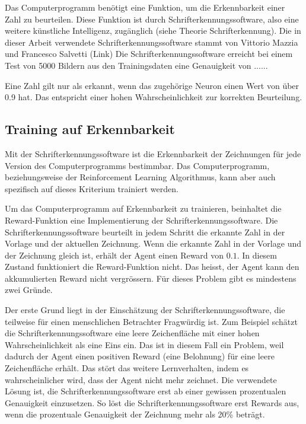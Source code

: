 Das Computerprogramm benötigt eine Funktion, um die Erkennbarkeit einer Zahl zu
beurteilen. Diese Funktion ist durch Schrifterkennungssoftware, also eine
weitere künstliche Intelligenz, zugänglich (siehe Theorie Schrifterkennung). Die
in dieser Arbeit verwendete Schrifterkennungssoftware stammt von Vittorio Mazzia
und Francesco Salvetti (Link) Die Schrifterkennungssoftware erreicht bei einem
Test von 5000 Bildern aus den Trainingsdaten eine Genauigkeit von ......%

Eine Zahl gilt nur als erkannt, wenn das zugehörige Neuron einen Wert von über 0.9
hat. Das entspricht einer hohen Wahrscheinlichkeit zur korrekten Beurteilung. 

\subsection{Training auf Erkennbarkeit}
Mit der Schrifterkennungssoftware ist die Erkennbarkeit der Zeichnungen für jede
Version des Computerprogramms bestimmbar. Das Computerprogramm, beziehungsweise
der Reinforcement Learning Algorithmus, kann aber auch spezifisch auf dieses
Kriterium trainiert werden. 

Um das Computerprogramm auf Erkennbarkeit zu trainieren, beinhaltet die
Reward-Funktion eine Implementierung der Schrifterkennungssoftware. Die
Schrifterkennungssoftware beurteilt in jedem Schritt die erkannte Zahl in der
Vorlage und der aktuellen Zeichnung. Wenn die erkannte Zahl in der Vorlage und
der Zeichnung gleich ist, erhält der Agent einen Reward von $0.1$. In diesem
Zustand funktioniert die Reward-Funktion nicht. Das heisst, der Agent kann den
akkumulierten Reward nicht vergrössern. Für dieses Problem gibt es mindestens
zwei Gründe.

Der erste Grund liegt in der Einschätzung der Schrifterkennungssoftware, die
teilweise für einen menschlichen Betrachter Fragwürdig ist. Zum Beispiel schätzt
die Schrifterkennungssoftware eine leere Zeichenfläche mit einer hohen
Wahrscheinlichkeit als eine Eins ein. Das ist in diesem Fall ein Problem, weil
dadurch der Agent einen positiven Reward (eine Belohnung) für eine leere
Zeichenfläche erhält. Das stört das weitere Lernverhalten, indem es
wahrscheinlicher wird, dass der Agent nicht mehr zeichnet. Die verwendete Lösung
ist, die Schrifterkennungssoftware erst ab einer gewissen prozentualen
Genauigkeit einzusetzen. So löst die Schrifterkennungssoftware erst Rewards aus,
wenn die prozentuale Genauigkeit der Zeichnung mehr als 20\% beträgt. 

